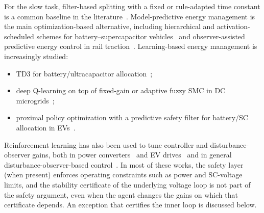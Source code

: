 For the slow task, filter-based splitting with a fixed or rule-adapted time constant is a common baseline in the literature~\cite{nguyen2021adaptive,corapsiz2022,access2019variabletau}. Model-predictive energy management is the main optimization-based alternative, including hierarchical and activation-scheduled schemes for battery--supercapacitor vehicles~\cite{ha2026hmpc,ha2026agsp} and observer-assisted predictive energy control in rail traction~\cite{ha2025dualobs}. Learning-based energy management is increasingly studied:
\begin{itemize}
\item TD3 for battery/ultracapacitor allocation~\cite{liu2023td3};
\item deep Q-learning on top of fixed-gain or adaptive fuzzy SMC in DC microgrids~\cite{charfeddine2025,jouili2026};
\item proximal policy optimization with a predictive safety filter for battery/SC allocation in EVs~\cite{xu2025safe}.
\end{itemize}
Reinforcement learning has also been used to tune controller and disturbance-observer gains, both in power converters~\cite{jiang2023drl,muktiadji2024} and EV drives~\cite{ha2025rltorque} and in general disturbance-observer-based control~\cite{choi2024dob,luna2026}. In most of these works, the safety layer (when present) enforces operating constraints such as power and SC-voltage limits, and the stability certificate of the underlying voltage loop is not part of the safety argument, even when the agent changes the gains on which that certificate depends. An exception that certifies the inner loop is discussed below.

